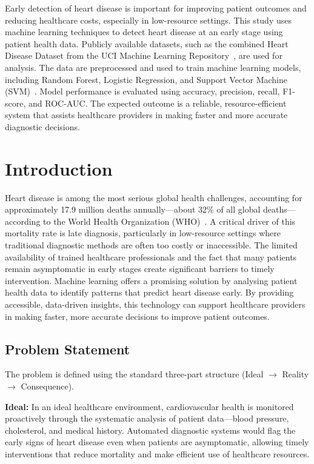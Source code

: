 \documentclass[12pt, a4paper]{article}
\begin{document}
Early detection of heart disease is important for improving patient outcomes and
reducing healthcare costs, especially in low-resource settings. This study uses
machine learning techniques to detect heart disease at an early stage using
patient health data. Publicly available datasets, such as the combined Heart
Disease Dataset from the UCI Machine Learning Repository~\cite{uci_heart}, are
used for analysis. The data are preprocessed and used to train machine learning
models, including Random Forest, Logistic Regression, and Support Vector Machine
(SVM)~\cite{rf_heart2021}. Model performance is evaluated using
accuracy, precision, recall, F1-score, and ROC-AUC. The expected outcome is a
reliable, resource-efficient system that assists healthcare providers in making
faster and more accurate diagnostic decisions.


\section{Introduction}

Heart disease is among the most serious global health challenges, accounting for
approximately 17.9 million deaths annually---about 32\% of all global deaths---
according to the World Health Organization (WHO)~\cite{who2023}. A critical
driver of this mortality rate is late diagnosis, particularly in low-resource
settings where traditional diagnostic methods are often too costly or
inaccessible. The limited availability of trained healthcare professionals and
the fact that many patients remain asymptomatic in early stages create
significant barriers to timely intervention. Machine learning offers a promising
solution by analysing patient health data to identify patterns that predict heart
disease early. By providing accessible, data-driven insights, this technology
can support healthcare providers in making faster, more accurate decisions to
improve patient outcomes.

\subsection{Problem Statement}

The problem is defined using the standard three-part structure
(Ideal $\rightarrow$ Reality $\rightarrow$ Consequence).

\textbf{Ideal:} In an ideal healthcare environment, cardiovascular health is monitored proactively through the systematic analysis of patient data---blood pressure, cholesterol, and medical history. Automated diagnostic systems would flag the early signs of heart disease even when patients are asymptomatic, allowing timely interventions that reduce mortality and make efficient use of healthcare resources.
\end{document}
